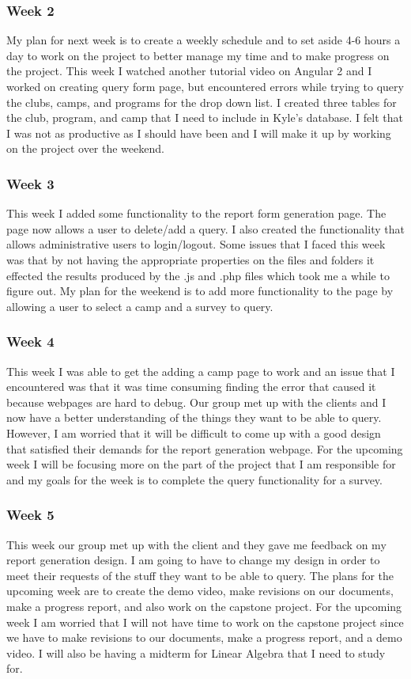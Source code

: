 \documentclass[letterpaper,10pt,serif, draftclsnofoot,onecolumn, compsoc, titlepage]{IEEEtran}
\begin{document}
\subsubsection{Week 2}
My plan for next week is to create a weekly schedule and to set aside 4-6 hours a day to work on the project to better manage my time and to make progress on the project.
This week I watched another tutorial video on Angular 2 and I worked on creating query form page, but encountered errors while trying to query the clubs, camps, and programs for the drop down list.
I created three tables for the club, program, and camp that I need to include in Kyle's database.
I felt that I was not as productive as I should have been and I will make it up by working on the project over the weekend.
\subsubsection{Week 3}
This week I added some functionality to the report form generation page.
The page now allows a user to delete/add a query.
I also created the functionality that allows administrative users to login/logout.
Some issues that I faced this week was that by not having the appropriate properties on the files and folders it effected the results produced by the .js and .php files which took me a while to figure out.
My plan for the weekend is to add more functionality to the page by allowing a user to select a camp and a survey to query.
\subsubsection{Week 4}
This week I was able to get the adding a camp page to work and an issue that I encountered was that it was time consuming finding the error that caused it because webpages are hard to debug.
Our group met up with the clients and I now have a better understanding of the things they want to be able to query.
However, I am worried that it will be difficult to come up with a good design that satisfied their demands for the report generation webpage.
For the upcoming week I will be focusing more on the part of the project that I am responsible for and my goals for the week is to complete the query functionality for a survey.
\subsubsection{Week 5}
This week our group met up with the client and they gave me feedback on my report generation design.
I am going to have to change my design in order to meet their requests of the stuff they want to be able to query.
The plans for the upcoming week are to create the demo video, make revisions on our documents, make a progress report, and also work on the capstone project.
For the upcoming week I am worried that I will not have time to work on the capstone project since we have to make revisions to our documents, make a progress report, and a demo video.
I will also be having a midterm for Linear Algebra that I need to study for.
\end{document}
